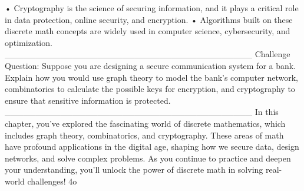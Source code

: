 •	Cryptography is the science of securing information, and it plays a critical role in data protection, online security, and encryption.
•	Algorithms built on these discrete math concepts are widely used in computer science, cybersecurity, and optimization.
________________________________________
Challenge Question:
Suppose you are designing a secure communication system for a bank. Explain how you would use graph theory to model the bank’s computer network, combinatorics to calculate the possible keys for encryption, and cryptography to ensure that sensitive information is protected.
________________________________________
In this chapter, you’ve explored the fascinating world of discrete mathematics, which includes graph theory, combinatorics, and cryptography. These areas of math have profound applications in the digital age, shaping how we secure data, design networks, and solve complex problems. As you continue to practice and deepen your understanding, you’ll unlock the power of discrete math in solving real-world challenges!
4o

